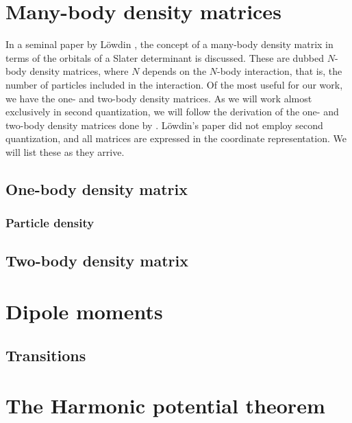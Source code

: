     \section{Many-body density matrices}
        In a seminal paper by Löwdin \cite{lowdin-density-matrices}, the
        concept of a many-body density matrix in terms of the orbitals of a
        Slater determinant is discussed. These are dubbed $N$-body density
        matrices, where $N$ depends on the $N$-body interaction, that is,
        the number of particles included in the interaction. Of the most
        useful for our work, we have the one- and two-body density matrices.
        As we will work almost exclusively in second quantization, we will
        follow the derivation of the one- and two-body density matrices done
        by \citeauthor{helgaker-molecular}. Löwdin's paper
        \cite{lowdin-density-matrices} did not employ second quantization,
        and all matrices are expressed in the coordinate representation. We
        will list these as they arrive.
        \subsection{One-body density matrix}
            \subsubsection{Particle density}
        \subsection{Two-body density matrix}

    \section{Dipole moments}
        \subsection{Transitions}

    \section{The Harmonic potential theorem}
